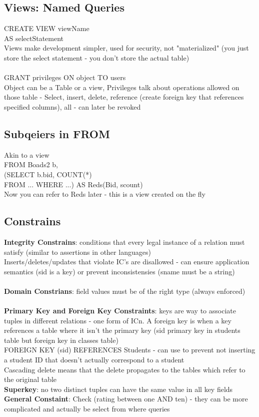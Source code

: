 \documentclass{article}
\begin{document}
\subsection{Views: Named Queries}
CREATE VIEW viewName \\ AS selectStatement \\ 
Views make development simpler, used for security, not "materialized" (you just store the select statement - you don't store the actual table) \\  \\
GRANT privileges ON object TO users \\ 
Object can be a Table or a view, Privileges talk about operations allowed on those table - Select, insert, delete, reference (create foreign key that references specified columns), all - can later be revoked

\subsection{Subqeiers in FROM}
Akin to a view \\ 
FROM Boads2 b, \\
(SELECT b.bid, COUNT(*) \\
FROM ... WHERE ...) AS Reds(Bid, scount) \\ 
Now you can refer to Reds later - this is a view created on the fly

\subsection{Constrains}
\textbf{Integrity Constrains}: conditions that every legal instance of a relation must satisfy (similar to assertions in other languages) \\
Inserts/deletes/updates that violate IC's are disallowed - can ensure application semantics (sid is a key) or prevent inconsistensies (sname must be a string) \\ \\
\textbf{Domain Constrians}: field values must be of the right type (always enforced) \\ \\
\textbf{Primary Key and Foreign Key Constraints}: keys are way to associate tuples in different relations - one form of ICn. A foreign key is when a key references a table where it isn't the primary key (sid primary key in students table but foreign key in classes table) \\ 
FOREIGN KEY (sid) REFERENCES Students - can use to prevent not inserting a student ID that doesn't actually correspond to a student \\
Cascading delete means that the delete propagates to the tables which refer to the original table \\
\textbf{Superkey}: no two distinct tuples can have the same value in all key fields \\
\textbf{General Constaint}: Check (rating between one AND ten) - they can be more complicated and actually be select from where queries
\end{document}
